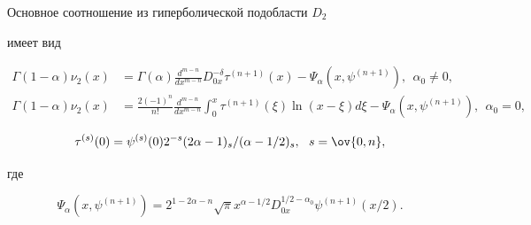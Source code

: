 \begin{lem} 


Основное соотношение из гиперболической подобласти $D_2$ 


имеет вид 


\begin{align*} 


\Gamma(1-\alpha)\nu_2(x)&=\Gamma(\alpha) 


\frac{d^{m-n}}{dx^{m-n}}D^{-\delta}_{0x}\tau^{(n+1)}(x) 


-\Psi_\alpha(x,\psi^{(n+1)}),\ \ \alpha_0\ne0,\\ 


% 


\Gamma(1-\alpha)\nu_2(x)&=\frac{2(-1)^n}{n!} 


\frac{d^{m-n}}{dx^{m-n}}\int^x_0 \tau^{(n+1)}(\xi) 


\ln(x-\xi)d\xi-\Psi_\alpha(x,\psi^{(n+1)}),\ \ \alpha_0=0, 


\end{align*} 


$$ 


\tau^{(s)}(0)=\psi^{(s)}(0)2^{-s}(2\alpha-1)_s/(\alpha-1/2)_s, 


\ \ s=\ov{0,n}, 


$$ 


где 


$$ 


\Psi_\alpha(x,\psi^{(n+1)})=2^{1-2\alpha-n} 


\sqrt{\pi}x^{\alpha-1/2}D^{1/2-\alpha_0}_{0x}\psi^{(n+1)}(x/2). 


$$ 


\end{lem} 


 


 


